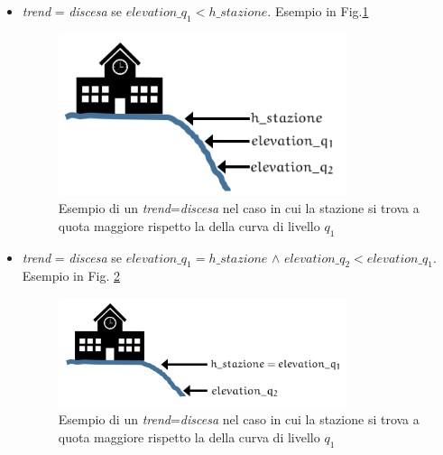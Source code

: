 \begin{enumerate}
\begin{itemize}
\item \textit{trend} = \textit{discesa} se $elevation\_q_1 < h\_stazione$.\newline
Esempio in Fig.\ref{fig:discesa1}

\begin{figure}[bth]
  \centering
    \includegraphics[width=0.8\textwidth]{img/discesa1}
      \caption{Esempio di un \textit{trend}=\textit{discesa}
      \label{fig:discesa1}
nel caso in cui la stazione si trova a quota maggiore rispetto la della curva di livello $q_1$}
\end{figure}



\item \textit{trend} = \textit{discesa} se $elevation\_q_1 = h\_stazione$ $\wedge$ $elevation\_q_2 < elevation\_q_1$.\newline
Esempio in Fig. \ref{fig:discesa2}
\begin{figure}[bth]
  \centering
    \includegraphics[width=0.8\textwidth]{img/discesa2}
      \caption{Esempio di un \textit{trend}=\textit{discesa}
        \label{fig:discesa2}
nel caso in cui la stazione si trova a quota maggiore rispetto la della curva di livello $q_1$}
\end{figure}

\end{itemize}


\end{enumerate}
